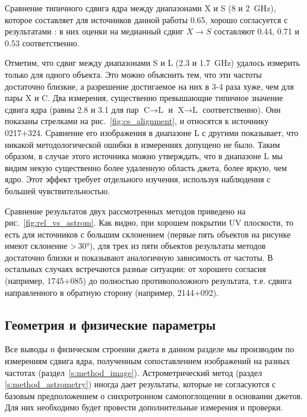 Сравнение типичного сдвига ядра между диапазонами X и S (8 и \SI{2}{\GHz}), которое составляет для
источников данной работы \SI{0.65}{\mas}, хорошо согласуется с результатами
\cite{Kovalev_2008,Sokolovsky_2011,Plavin2018}: в них оценки на медианный
сдвиг $X\to S$ составляют 0.44, 0.71 и \SI{0.53}{\mas} соответственно.

Отметим, что сдвиг между диапазонами S и L (2.3 и \SI{1.7}{\GHz}) удалось измерить только для одного
объекта. Это можно объяснить тем, что эти частоты достаточно близкие, а разрешение достигаемое на
них в 3-4 раза хуже, чем для пары X и C. Два измерения, существенно превышающие типичное значение
сдвига ядра (равны 2.8 и \SI{3.1}{\mas} для пар $\text{C} \to \text{L}$ и $\text{X} \to \text{L}$
соответственно). Они показаны стрелками на рис.~\ref{fig:cs_alignment}, и относятся к источнику
0217+324. Сравнение его изображения в диапазоне L с другими показывает, что никакой методологической
ошибки в измерениях допущено не было. Таким образом, в случае этого источника можно утверждать, что
в диапазоне L мы видим некую существенно более удаленную область джета, более яркую, чем ядро. Этот
эффект требует отдельного изучения, используя наблюдения с большей чувствительностью.

Сравнение результатов двух рассмотренных методов приведено на рис.~\ref{fig:rel_vs_astrom}. Как
видно, при хорошем покрытии UV плоскости, то есть для источников с большим склонением (первые пять
объектов на рисунке имеют склонение >\,\ang{30}), для трех из пяти объектов результаты методов
достаточно близки и показывают аналогичную зависимость от частоты. В остальных случаях встречаются
разные ситуации: от хорошего согласия (например, 1745+085) до полностью противоположного
результата, т.е. сдвига направленного в обратную сторону (например, 2144+092).

\subsection{Геометрия и физические параметры}
\label{s:res_phys}

Все выводы о физическом строении джета в данном разделе мы производим по измерениям сдвига ядра,
полученным сопоставлением изображений на разных частотах (раздел~\ref{s:method_image}).
Астрометрический метод (раздел \ref{s:method_astrometry}) иногда дает результаты, которые не
согласуются с базовым предположением о синхротронном самопоглощении в основании джетов.
Для них необходимо будет провести дополнительные измерения и проверки.

